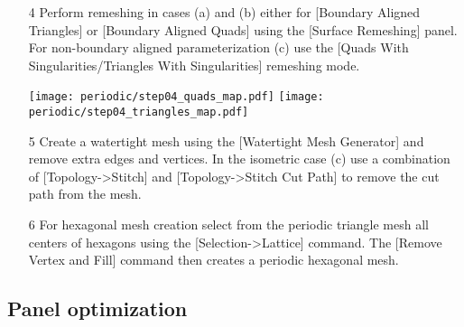 \documentclass[Thesis.tex]{subfiles}
\begin{document}
\begin{itemize}
\item[4] Perform remeshing in cases (a) and (b) either for [Boundary Aligned Triangles] or [Boundary Aligned Quads] using the [Surface Remeshing] panel. For non-boundary aligned parameterization (c) use the [Quads With Singularities/Triangles With Singularities] remeshing mode.\\

\begin{center}
\begin{minipage}{0.9\linewidth}
            \centering
            \texttt{[image: periodic/step04\_quads\_map.pdf]}
            \texttt{[image: periodic/step04\_triangles\_map.pdf]}
\end{minipage}
\end{center}    

\item[5] Create a watertight mesh using the [Watertight Mesh Generator] and remove extra edges and vertices. In the isometric case (c) use a combination of [Topology->Stitch] and [Topology->Stitch Cut Path] to remove the cut path from the mesh.
\item[6] For hexagonal mesh creation select from the periodic triangle mesh all centers of hexagons using the [Selection->Lattice] command. The [Remove Vertex and Fill] command then creates a periodic hexagonal mesh.
\begin{center}
\begin{minipage}{0.9\linewidth}
            \centering
\end{minipage}
\end{center}                
\end{itemize}

\subsection{Panel optimization}
\end{document}
